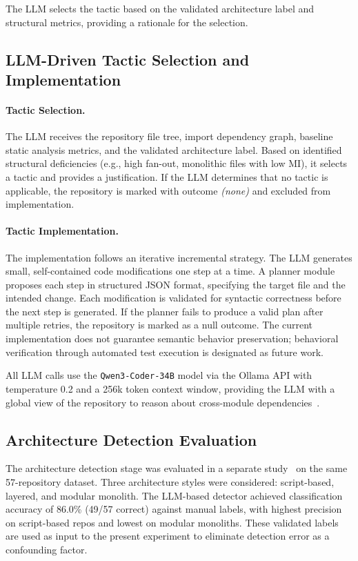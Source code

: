 \documentclass[sigconf,review,anonymous]{acmart}
\begin{document}
The LLM selects the tactic based on the validated architecture label and structural metrics, providing a rationale for the selection.

\subsection{LLM-Driven Tactic Selection and Implementation}

\paragraph{Tactic Selection.} The LLM receives the repository file tree, import dependency graph, baseline static analysis metrics, and the validated architecture label. Based on identified structural deficiencies (e.g., high fan-out, monolithic files with low MI), it selects a tactic and provides a justification. If the LLM determines that no tactic is applicable, the repository is marked with outcome \textit{(none)} and excluded from implementation.

\paragraph{Tactic Implementation.} The implementation follows an iterative incremental strategy. The LLM generates small, self-contained code modifications one step at a time. A planner module proposes each step in structured JSON format, specifying the target file and the intended change. Each modification is validated for syntactic correctness before the next step is generated. If the planner fails to produce a valid plan after multiple retries, the repository is marked as a null outcome. The current implementation does not guarantee semantic behavior preservation; behavioral verification through automated test execution is designated as future work.

All LLM calls use the \texttt{Qwen3-Coder-34B} model via the Ollama API with temperature 0.2 and a 256k token context window, providing the LLM with a global view of the repository to reason about cross-module dependencies~\cite{piao2025refactoring}.

\subsection{Architecture Detection Evaluation}
\label{sec:eval_arch_detection}

The architecture detection stage was evaluated in a separate study~\cite{chertkov_2026_20051151} on the same 57-repository dataset. Three architecture styles were considered: script-based, layered, and modular monolith. The LLM-based detector achieved classification accuracy of 86.0\% (49/57 correct) against manual labels, with highest precision on script-based repos and lowest on modular monoliths. These validated labels are used as input to the present experiment to eliminate detection error as a confounding factor.
\end{document}
